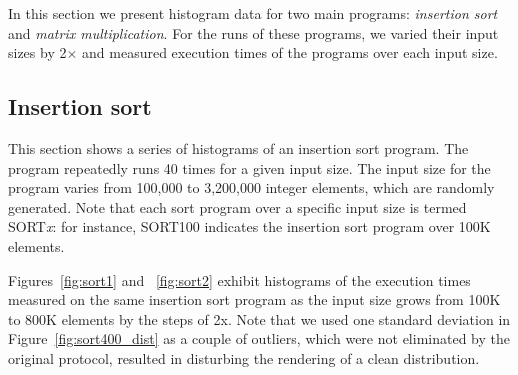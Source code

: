 \documentclass[10pt]{article}
\begin{document}
In this section we present histogram data 
for two main programs: {\it insertion sort} and {\it matrix multiplication}. 
For the runs of these programs, we varied their input sizes by 2{\small $\times$} 
and measured execution times of the programs over each input size. 

\subsection{Insertion sort~\label{sec:sort}} 
This section shows a series of histograms of an insertion sort program. 
The program repeatedly runs 40 times for a given input size. 
The input size for the program 
varies from 100,000 to 3,200,000 integer elements, which are randomly generated. 
Note that each sort program over a specific input size is termed SORT{\it x}: 
for instance, SORT100 indicates the insertion sort program over 100K elements. 

Figures~\ref{fig:sort1} and ~\ref{fig:sort2} exhibit 
histograms of the execution times measured on the same insertion sort program as 
the input size grows from 100K to 800K elements by the steps of 2x. 
Note that we used one standard deviation in Figure~\ref{fig:sort400_dist} as
a couple of outliers, which were not eliminated by the original protocol, 
resulted in disturbing the rendering of a clean distribution. 

\pagebreak
\end{document}
